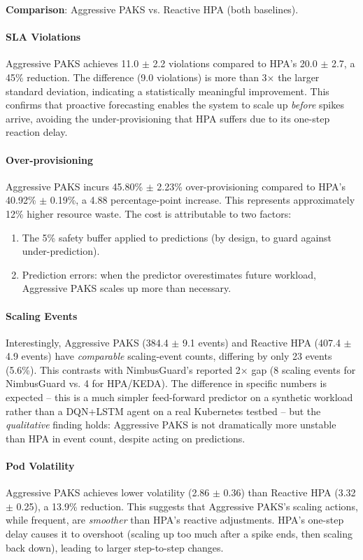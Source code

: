 \textbf{Comparison}: Aggressive PAKS vs. Reactive HPA (both baselines).

\paragraph{SLA Violations} Aggressive PAKS achieves 11.0 $\pm$ 2.2 violations compared to HPA's 20.0 $\pm$ 2.7, a 45\% reduction. The difference (9.0 violations) is more than 3× the larger standard deviation, indicating a statistically meaningful improvement. This confirms that proactive forecasting enables the system to scale up \emph{before} spikes arrive, avoiding the under-provisioning that HPA suffers due to its one-step reaction delay.

\paragraph{Over-provisioning} Aggressive PAKS incurs 45.80\% $\pm$ 2.23\% over-provisioning compared to HPA's 40.92\% $\pm$ 0.19\%, a 4.88 percentage-point increase. This represents approximately 12\% higher resource waste. The cost is attributable to two factors:
\begin{enumerate}
  \item The 5\% safety buffer applied to predictions (by design, to guard against under-prediction).
  \item Prediction errors: when the predictor overestimates future workload, Aggressive PAKS scales up more than necessary.
\end{enumerate}

\paragraph{Scaling Events} Interestingly, Aggressive PAKS (384.4 $\pm$ 9.1 events) and Reactive HPA (407.4 $\pm$ 4.9 events) have \emph{comparable} scaling-event counts, differing by only 23 events (5.6\%). This contrasts with NimbusGuard's reported 2× gap (8 scaling events for NimbusGuard vs. 4 for HPA/KEDA). The difference in specific numbers is expected -- this is a much simpler feed-forward predictor on a synthetic workload rather than a DQN+LSTM agent on a real Kubernetes testbed -- but the \emph{qualitative} finding holds: Aggressive PAKS is not dramatically more unstable than HPA in event count, despite acting on predictions.

\paragraph{Pod Volatility} Aggressive PAKS achieves lower volatility (2.86 $\pm$ 0.36) than Reactive HPA (3.32 $\pm$ 0.25), a 13.9\% reduction. This suggests that Aggressive PAKS's scaling actions, while frequent, are \emph{smoother} than HPA's reactive adjustments. HPA's one-step delay causes it to overshoot (scaling up too much after a spike ends, then scaling back down), leading to larger step-to-step changes.

